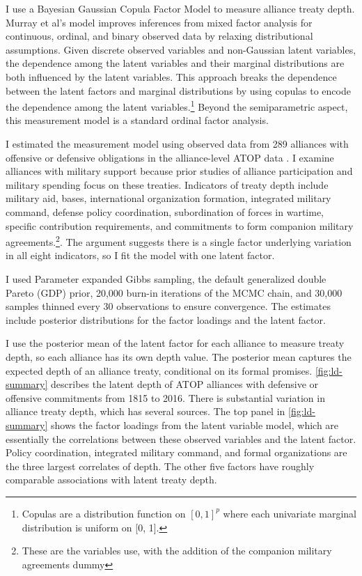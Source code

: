 \documentclass[12pt]{article}
\begin{document}
I use a Bayesian Gaussian Copula Factor Model \citep{Murrayetal2013} to measure alliance treaty depth. 
Murray et al's model improves inferences from mixed factor analysis for continuous, ordinal, and binary observed data by relaxing distributional assumptions.
Given discrete observed variables and non-Gaussian latent variables, the dependence among the latent variables and their marginal distributions are both influenced by the latent variables.
This approach breaks the dependence between the latent factors and marginal distributions by using copulas to encode the dependence among the latent variables.\footnote{Copulas are a distribution function on $[0, 1]^p$ where each univariate marginal distribution is uniform on [0, 1].}
Beyond the semiparametric aspect, this measurement model is a standard ordinal factor analysis.


I estimated the measurement model using observed data from 289 alliances with offensive or defensive obligations in the alliance-level ATOP data \citep{Leedsetal2002}. 
I examine alliances with military support because prior studies of alliance participation and military spending focus on these treaties.
Indicators of treaty depth include military aid, bases, international organization formation, integrated military command, defense policy coordination, subordination of forces in wartime, specific contribution requirements, and commitments to form companion military agreements.\footnote{These are the variables \citet{LeedsAnac2005} use, with the addition of the companion military agreements dummy}. 
The argument suggests there is a single factor underlying variation in all eight indicators, so I fit the model with one latent factor. 


I used Parameter expanded Gibbs sampling, the default generalized double Pareto (GDP) prior, 20,000 burn-in iterations of the MCMC chain, and 30,000 samples thinned every 30 observations to ensure convergence. 
The estimates include posterior distributions for the factor loadings and the latent factor. 


I use the posterior mean of the latent factor for each alliance to measure treaty depth, so each alliance has its own depth value.
The posterior mean captures the expected depth of an alliance treaty, conditional on its formal promises. 
\autoref{fig:ld-summary} describes the latent depth of ATOP alliances with defensive or offensive commitments from 1815 to 2016.
There is substantial variation in alliance treaty depth, which has several sources. 
The top panel in \autoref{fig:ld-summary} shows the factor loadings from the latent variable model, which are essentially the correlations between these observed variables and the latent factor. 
Policy coordination, integrated military command, and formal organizations are the three largest correlates of depth. 
The other five factors have roughly comparable associations with latent treaty depth. 
\end{document}
